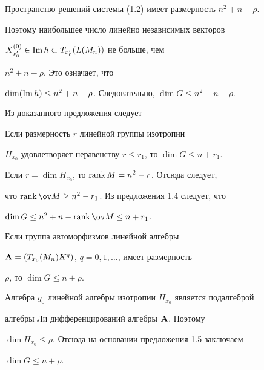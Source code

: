  


\begin{pf} 


Пространство решений системы (1.2) имеет размерность $n^2+n-\rho$. 


Поэтому наибольшее число линейно независимых векторов 


$X^{(0)}_{x'_0}\in\operatorname{Im} h\subset T_{x'_0}(L(M_n))$ не больше, чем 


$n^2+n-\rho$. Это означает, что 


$\dim(\operatorname{Im} h)\le n^2+n-\rho$. Следовательно, $\dim G\le n^2+n-\rho$. 


\end{pf} 


 


Из доказанного предложения следует 


 


\begin{props} 


Если размерность $r$ линейной группы изотропии  


$H_{x_0}$ удовлетворяет неравенству $r\le r_1$, то $\dim G\le n+r_1$. 


\end{props} 


 


\begin{pf} 


Если $r=\dim H_{x_0}$, то $\operatorname{rank} M=n^2-r$. Отсюда следует,  


что $\rank\ov M\ge n^2-r_1$. Из предложения 1.4 следует, что 


$\dim G\le n^2+n-\rank\ov M\le n+r_1$. 


\end{pf} 


 


\begin{props} 


Если группа автоморфизмов линейной алгебры  


$\bold A=(T_{x_0}(M_n)K^q)$, $q=0,1,\dotsc$, имеет размерность 


$\rho$, то $\dim G\le n+\rho$. 


\end{props} 


 


\begin{pf} 


Алгебра $g_0$ линейной алгебры изотропии $H_{x_0}$ является подалгеброй  


алгебры Ли дифференцирований алгебры $\bold A$. Поэтому  


$\dim H_{x_0}\le \rho$. Отсюда на основании предложения 1.5 заключаем  


$\dim G\le n+\rho$. 


\end{pf} 


